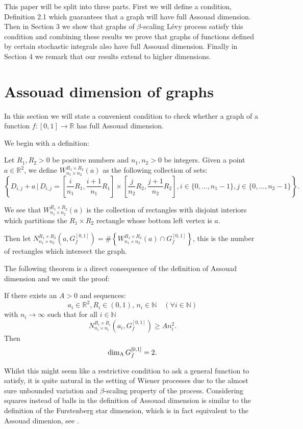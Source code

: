 This paper will be split into three parts. First we will define a condition, Definition 2.1 which guarantees that a graph will have full Assouad dimension. Then in Section 3 we show that graphs of $\beta$-scaling L\'evy process satisfy this condition and combining these results we prove that graphs of functions defined by certain stochastic integrals also have full Assouad dimension. Finally in Section 4 we remark that our results extend to higher dimensions.

\section{Assouad dimension of graphs}
In this section we will state a convenient condition to check whether a graph of a function $f:[0,1]\to\mathbb{R}$ has full Assouad dimension.

We begin with a definition:

\begin{defn}\label{Win}
	Let $R_1,R_2>0$ be positive numbers and $n_1,n_2>0$ be integers. Given a point $a\in\mathbb{R}^2$, we define $W_{n_1\times n_2}^{R_1\times R_2}(a)$ as the following collection of sets:
	\[	
	\left\{D_{i,j}+a \, \vert \, D_{i,j}=\left[\frac{i}{n_1}R_1,\frac{i+1}{n_1}R_1\right]\times \left[\frac{j}{n_2}R_2,\frac{j+1}{n_2}R_2\right], i\in\{0,\dots,n_1-1\}, j\in\{0,\dots,n_2-1\}\right\}.
	\]
	
	We see that $W_{n_1\times n_2}^{R_1\times R_2}(a)$ is the collection of rectangles with disjoint interiors which partitions the $R_1\times R_2$ rectangle whose bottom left vertex is $a$.
	
	Then let $N_{n_1\times n_2}^{R_1 \times R_2 }(a,G_f^{[0,1]})= \# \left\{ W_{n_1\times n_2}^{R_1\times R_2}(a) \cap G_f^{[0,1]} \right\}$, this is the number of rectangles which intersect the graph.
\end{defn}

The following theorem is a direct consequence of the definition of Assouad dimension and we omit the proof:


\begin{thm}\label{graph}
	If there exists an $A>0$ and sequences:
	\[
	a_i\in \mathbb{R}^2,R_i\in (0,1),\, n_i\in\mathbb{N} \quad (\forall i\in \mathbb{N})
	\]
	with $n_i \rightarrow \infty$ such that for all $i\in\mathbb{N}$
	\[
	N_{n_i\times n_i}^{R_i \times R_i }(a_i,G_f^{[0,1]})\geq A n_i^2.
	\]
	Then
	\[
	\dim_{\textup{A}} G_f^{[0,1]}=2.
	\]
\end{thm}

Whilst this might seem like a restrictive condition to ask a general function to satisfy, it is quite natural in the setting of Wiener processes due to the almost sure unbounded variation and $\beta$-scaling property of the process. Considering squares instead of balls in the definition of Assouad dimension is similar to the definition of the Furstenberg star dimension, which is in fact equivalent to the Assouad dimenion, see \cite{chenwuwu}.

